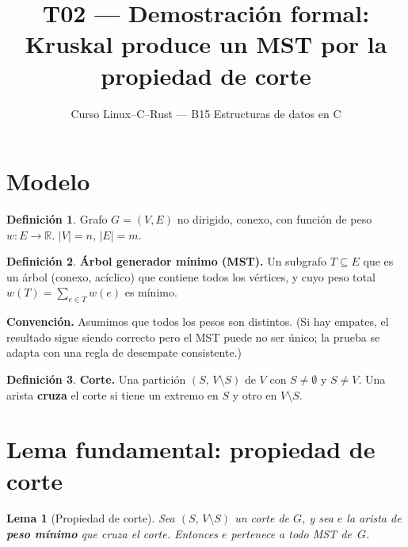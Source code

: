 \documentclass[11pt, letterpaper]{article}
\title{%
  T02 --- Demostración formal:\\[4pt]
  Kruskal produce un MST por la propiedad de corte
}
\author{Curso Linux--C--Rust --- B15 Estructuras de datos en C}
\date{}
\theoremstyle{definition}
\newtheorem{definition}{Definición}[section]
\theoremstyle{plain}
\newtheorem{lemma}[theorem]{Lema}
\theoremstyle{remark}
\begin{document}
\maketitle
\tableofcontents

\section{Modelo}

\begin{definition}
Grafo $G = (V, E)$ no dirigido, conexo, con función de peso
$w: E \to \mathbb{R}$. $|V| = n$, $|E| = m$.
\end{definition}

\begin{definition}
\textbf{Árbol generador mínimo (MST).} Un subgrafo $T \subseteq E$
que es un árbol (conexo, acíclico) que contiene todos los vértices,
y cuyo peso total $w(T) = \sum_{e \in T} w(e)$ es mínimo.
\end{definition}

\textbf{Convención.} Asumimos que todos los pesos son distintos. (Si
hay empates, el resultado sigue siendo correcto pero el MST puede no
ser único; la prueba se adapta con una regla de desempate
consistente.)

\begin{definition}
\textbf{Corte.} Una partición $(S,\, V \setminus S)$ de $V$ con
$S \neq \emptyset$ y $S \neq V$. Una arista \textbf{cruza} el corte
si tiene un extremo en $S$ y otro en $V \setminus S$.
\end{definition}

\section{Lema fundamental: propiedad de corte}

\begin{lemma}[Propiedad de corte]\label{lem:cut}
Sea $(S,\, V \setminus S)$ un corte de $G$, y sea $e$ la arista de
\textbf{peso mínimo} que cruza el corte. Entonces $e$ pertenece a
todo MST de~$G$.
\end{lemma}
\end{document}
